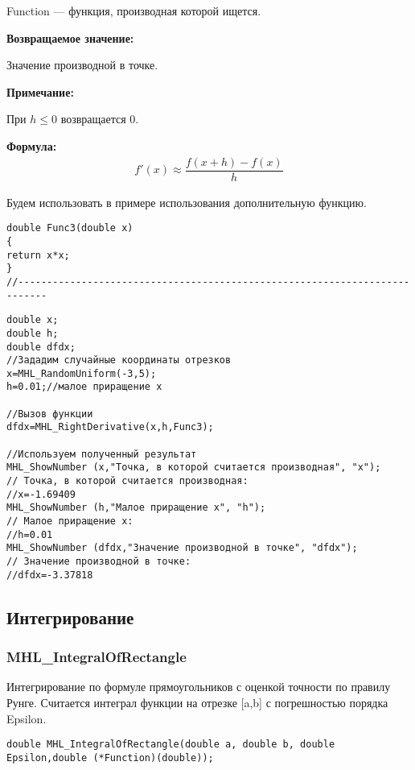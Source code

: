 \documentclass[a4paper,12pt]{article}
\begin{document}
 Function --- функция, производная которой ищется.

\textbf{Возвращаемое значение:}
 
 Значение производной в точке.
 
 \textbf{Примечание:}
 
 При $h\leq0$ возвращается $0$.

\textbf{Формула:}
\begin{eqnarray*}
f'\left( x\right) \approx \dfrac{f\left( x+h\right)-f\left( x\right) }{h}
\end{eqnarray*}

Будем использовать в примере использования дополнительную функцию.

\begin{lstlisting}[caption=Дополнительная функция]
double Func3(double x)
{
return x*x;
}
//---------------------------------------------------------------------------
\end{lstlisting}


\begin{lstlisting}[label=code_use_MHL_RightDerivative,caption=Пример использования]
double x;
double h;
double dfdx;
//Зададим случайные координаты отрезков
x=MHL_RandomUniform(-3,5);
h=0.01;//малое приращение x

//Вызов функции
dfdx=MHL_RightDerivative(x,h,Func3);

//Используем полученный результат
MHL_ShowNumber (x,"Точка, в которой считается производная", "x");
// Точка, в которой считается производная:
//x=-1.69409
MHL_ShowNumber (h,"Малое приращение x", "h");
// Малое приращение x:
//h=0.01
MHL_ShowNumber (dfdx,"Значение производной в точке", "dfdx");
// Значение производной в точке:
//dfdx=-3.37818
\end{lstlisting}

\subsection{Интегрирование}

\subsubsection{MHL\_IntegralOfRectangle}\label{MHL_IntegralOfRectangle}

Интегрирование по формуле прямоугольников с оценкой точности по правилу Рунге. Считается интеграл функции на отрезке [a,b] с погрешностью порядка Epsilon.


\begin{lstlisting}[label=code_syntax_MHL_IntegralOfRectangle,caption=Синтаксис]
double MHL_IntegralOfRectangle(double a, double b, double Epsilon,double (*Function)(double));
\end{lstlisting}
\end{document}
